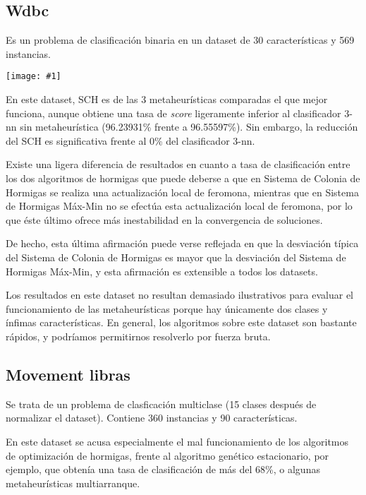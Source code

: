 \documentclass[a4paper,11pt]{article}
\newcommand{\imagen}[4]{
  \begin{minipage}{\linewidth}
    \centering
    \texttt{[image: \#1]}
    \captionof{figure}{#2}
    \label{#3}
  \end{minipage} 
}
\begin{document}
  \subsection{Wdbc}
  
  Es un problema de clasificación binaria en un dataset de 30 características y 569 instancias.
  
  \imagen{../data/och/wdbc.png}{Tasas de clasificación en Wdbc}{wdbcgraph}{0.7}
  
  En este dataset, SCH es de las 3 metaheurísticas comparadas el que mejor funciona, aunque obtiene una tasa de \textit{score}
  ligeramente inferior al clasificador 3-nn sin metaheurística (96.23931\% frente a 96.55597\%). Sin embargo, la reducción
  del SCH es significativa frente al 0\% del clasificador 3-nn. 
  
  Existe una ligera diferencia de resultados en cuanto a tasa de clasificación entre los dos algoritmos de hormigas que
  puede deberse a que en Sistema de Colonia de Hormigas se realiza una actualización local de feromona, mientras que en
  Sistema de Hormigas Máx-Min no se efectúa esta actualización local de feromona, por lo que éste último ofrece más inestabilidad en la convergencia de soluciones.
  
  De hecho, esta última afirmación puede verse reflejada en que la desviación típica del Sistema de Colonia de Hormigas es mayor
  que la desviación del Sistema de Hormigas Máx-Min, y esta afirmación es extensible a todos los datasets.
  
  Los resultados en este dataset no resultan demasiado ilustrativos para evaluar el funcionamiento de las metaheurísticas porque
  hay únicamente dos clases y ínfimas características. En general, los algoritmos sobre este dataset son bastante rápidos, y
  podríamos permitirnos resolverlo por fuerza bruta.
  
  \subsection{Movement libras}
  
  Se trata de un problema de clasficación multiclase (15 clases después de normalizar el dataset). 
  Contiene 360 instancias y 90 características.
  
  En este dataset se acusa especialmente el mal funcionamiento de los algoritmos de optimización de hormigas, frente al algoritmo
  genético estacionario, por ejemplo, que obtenía una tasa de clasificación de más del 68\%, o algunas metaheurísticas multiarranque.
  
\end{document}
